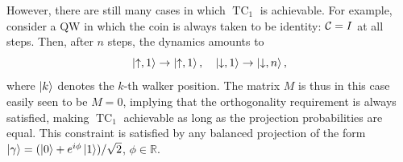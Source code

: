 \documentclass[
	aps, pra,
	superscriptaddress, twocolumn,
	floatfix,
	10pt
]{revtex4-1}
\newcommand{\on}[1]{\operatorname{#1}}
\newcommand{\RR}{\mathbb{R}}
\newcommand{\commale}[1]{{\textcolor{red} {\it{[Note (Ale): #1]}}}}
\begin{document}
However, there are still many cases in which $\on{TC}_1$ is achievable. For example, consider a QW in which the coin is always taken to be identity: ${\cal C}=I$ at all steps. Then, after $n$ steps, the dynamics amounts to
\begin{equation}
    \ket{\uparrow,1} \to \ket{\uparrow, 1}, \quad
    \ket{\downarrow,1} \to \ket{\downarrow, n},
\end{equation}
where $\ket k$ denotes the $k$-th walker position.
The matrix $M$ is thus in this case easily seen to be $M=0$, implying that the orthogonality requirement is always satisfied, making $\on{TC}_1$ achievable as long as the projection probabilities are equal. This constraint is satisfied by any balanced projection of the form $\ket\gamma=(\ket0+e^{i\phi}\ket1)/\sqrt2$, $\phi\in\RR$.

\end{document}
